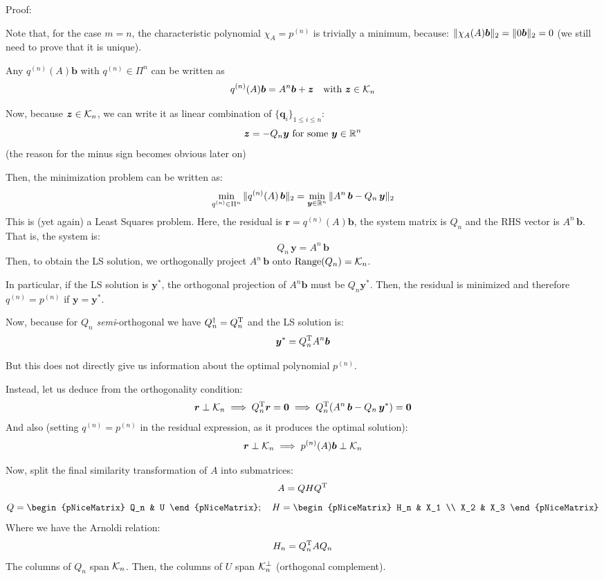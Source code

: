 \documentclass[
  12pt,
  paper=a4,
]{scrartcl} %
\begin{document}
Proof:

Note that, for the case $m=n$, the characteristic polynomial $\chi_A=p^{(n)}$ is trivially a minimum, because: $\|\chi_A(A)\bm b\|_2=\|0\bm b\|_2 = 0$ (we still need to prove that it is unique).

Any $q^{(n)}(A)\bm b$ with $q^{(n)}\in \Pi^n$ can be written as
\[
    q^{(n)}(A)\bm b = A^n \bm b + \bm z
    \quad \text{with }
    \bm z \in \mathcal{K}_{n}
\]

Now, because $\bm z\in \mathcal{K}_{n}$, we can write it as linear combination of $\{\bm q_i\}_{1\le i\le n}$:
\[ \bm z = -Q_n \bm y \text{ for some }\bm y \in \mathbb R^n \]
(the reason for the minus sign becomes obvious later on)

Then, the minimization problem can be written as:
\[
    \min_{q^{(n)}\in \Pi^n} \|q^{(n)}(A)\,\bm b\|_2=
    \min_{\bm y \in \mathbb R^n} \|A^n\,\bm b - Q_n\,\bm y\|_2
\]
This is (yet again) a Least Squares problem. Here, the residual is $\bm r=q^{(n)}(A)\bm b$, the system matrix is $Q_n$ and the RHS vector is $A^n\,\bm b$. That is, the system is:
\[
    Q_n\,\bm y = A^n\,\bm b
\]
Then, to obtain the LS solution, we orthogonally project $A^n\,\bm b$ onto $\operatorname{Range} (Q_n)=\mathcal{K}_n$.

In particular, if the LS solution is $\bm y^*$, the orthogonal projection of $A^n\bm b$ must be $Q_n\bm y^*$. Then, the residual is minimized and therefore $q^{(n)}=p^{(n)}$ if $\bm y=\bm y^*$.

Now, because for $Q_n$ \emph{semi}-orthogonal we have $Q_n^{\dagger} = Q_n^{\mathrm{T}}$ and the LS solution is:
\[\bm y^* = Q_n^{\mathrm{T}} A^n \bm b\]

But this does not directly give us information about the optimal polynomial $p^{(n)}$.

Instead, let us deduce from the orthogonality condition:
\[
    \bm r\perp \mathcal{K}_n\implies
    Q_n^{\mathrm{T}} \bm r =\bm 0 \implies
    Q_n^{\mathrm{T}} ({A^n\,\bm b - Q_n\,\bm y^*}) =\bm 0
\]
And also (setting $q^{(n)}=p^{(n)}$ in the residual expression, as it produces the optimal solution):
\[
\bm r\perp \mathcal{K}_n\implies p^{(n)}(A)\bm b \perp \mathcal{K}_n
\]

Now, split the final similarity transformation of $A$ into submatrices:
\[
    A = Q HQ^{\mathrm{T}}
\]
\[
    Q = \begin{pNiceMatrix}
        Q_n & U
    \end{pNiceMatrix};\quad
    H = \begin{pNiceMatrix}
        H_n & X_1 \\
        X_2 & X_3
    \end{pNiceMatrix}
\]
Where we have the Arnoldi relation:
\[
    H_n = Q_n^{\mathrm{T}} A Q_n
\]
The columns of $Q_n$ span $\mathcal{K}_n$. 
Then, the columns of $U$ span $\mathcal{K}_n^\perp$ (orthogonal complement).
\end{document}
